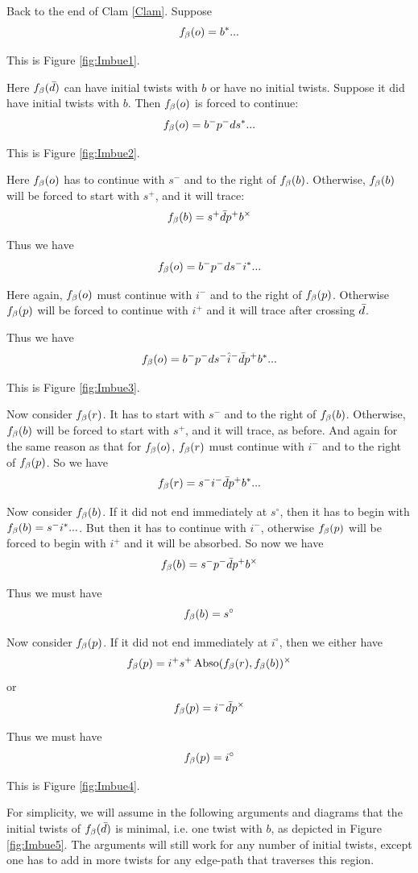  \label{Imbue}
Back to the end of Clam \ref{Clam}. Suppose
\[
f_\beta(o) = b^*...
\]

This is Figure \ref{fig:Imbue1}.

Here $f_\beta(\bar{d})$ can have initial twists with $b$ or have no initial twists. Suppose it did have initial twists with $b$. Then $f_\beta(o)$ is forced to continue:
\[
f_\beta(o) = b^- p^- d s^*...
\]

This is Figure \ref{fig:Imbue2}.

Here $f_\beta(o)$ has to continue with $s^-$ and to the right of $f_\beta(b)$. Otherwise, $f_\beta(b)$ will be forced to start with $s^+$, and it will trace:
\[
f_\beta(b) = s^+ \bar{d} p^+ b^\times
\]

Thus we have
\[
f_\beta(o) = b^- p^- d s^- i^*...
\]

Here again, $f_\beta(o)$ must continue with $i^-$ and to the right of $f_\beta(p)$. Otherwise $f_\beta(p)$ will be forced to continue with $i^+$ and it will trace after crossing $\bar{d}$. 

Thus we have
\[
f_\beta(o) = b^- p^- d s^- \hat{i}^-\bar{d} p^+ b^*...
\]

This is Figure \ref{fig:Imbue3}.

Now consider $f_\beta(r)$. It has to start with $s^-$ and to the right of $f_\beta(b)$. Otherwise, $f_\beta(b)$ will be forced to start with $s^+$, and it will trace, as before. And again for the same reason as that for $f_\beta(o)$, $f_\beta(r)$ must continue with $i^-$ and to the right of $f_\beta(p)$. So we have
\[
f_\beta(r) = s^- i^- \bar{d} p^+ b^*...
\]

Now consider $f_\beta(b)$. If it did not end immediately at $s^\circ$, then it has to begin with $f_\beta(b) = s^- i^*...$. But then it has to continue with $i^-$, otherwise $f_\beta(p)$ will be forced to begin with $i^+$ and it will be absorbed. So now we have
\[
f_\beta(b) = s^- p^- \bar{d} p^+ b^\times
\]

Thus we must have
\[
f_\beta(b) = s^\circ
\]

Now consider $f_\beta(p)$. If it did not end immediately at $i^\circ$, then we either have
\[
f_\beta(p) = i^+ s^+ \operatorname{Abso}(f_\beta(r), f_\beta(b))^\times
\]
or
\[
f_\beta(p) = i^- \bar{d} p^\times
\]

Thus we must have
\[
f_\beta(p) = i^\circ
\]

This is Figure \ref{fig:Imbue4}.

For simplicity, we will assume in the following arguments and diagrams that the initial twists of $f_\beta(\bar{d})$ is minimal, i.e. one twist with $b$, as depicted in Figure \ref{fig:Imbue5}. The arguments will still work for any number of initial twists, except one has to add in more twists for any edge-path that traverses this region.

